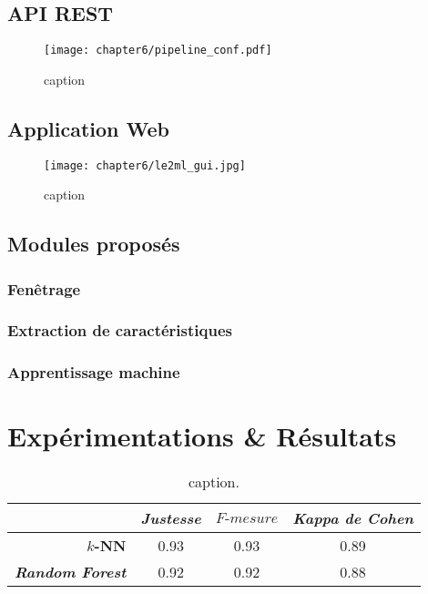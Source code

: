 \subsection{API REST}

\begin{figure}[H]
	\centering
	\texttt{[image: chapter6/pipeline\_conf.pdf]}
        \caption{caption}
	\label{fig:pipeline_conf}
\end{figure}

\subsection{Application Web}

\begin{figure}[H]
	\centering
	\texttt{[image: chapter6/le2ml\_gui.jpg]}
        \caption{caption}
	\label{fig:le2ml_gui}
\end{figure}

\subsection{Modules proposés}

\subsubsection{Fenêtrage}

\subsubsection{Extraction de caractéristiques}

\subsubsection{Apprentissage machine}

\section{Expérimentations \& Résultats}

\begin{table}[H]
    \centering
    \caption{caption.}
    \label{tab:previous_results}
    \begin{tabular}{@{}rccc@{}}
      \toprule
      \multicolumn{1}{l}{}              & \textit{Justesse}  &  $F\mbox{-} mesure$  & \textit{Kappa de Cohen}  \\ \midrule
      \textbf{$k$-NN}                   & 0.93               & 0.93                 & 0.89                     \\
      \textbf{\textit{Random Forest}}   & 0.92               & 0.92                 & 0.88                     \\ \bottomrule
    \end{tabular}
\end{table}

